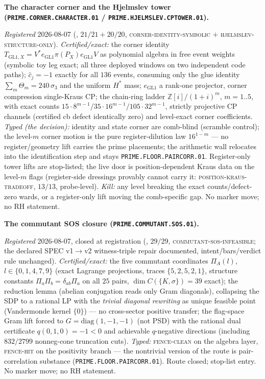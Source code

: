 \documentclass[11pt,a4paper]{article}
\newcommand{\Z}{\mathbb Z}
\begin{document}
\par\smallskip\noindent\textbf{The character corner and the
Hjelmslev tower (\texttt{PRIME.CORNER.CHARACTER.01} /
\texttt{PRIME.HJELMSLEV.CPTOWER.01}).}
{\sloppy
\emph{Registered} 2026-08-07
(, $21/21 + 20/20$,
\textsc{corner-identity-symbolic} $+$
\textsc{hjelmslev-structure-only}).  \emph{Certified/exact:} the
corner identity $T_{\mathrm{GL1},X} = V^* e_{\mathrm{GL1}}
\pi(P_X) e_{\mathrm{GL1}} V$ as polynomial algebra in free event
weights (symbolic toy leg exact; all three deployed windows on
two independent code paths); $\hat c_j = -1$ exactly for all
$136$ events, consuming only the glue identity
$\sum_m \Theta_m = 240\,\sigma_3$ and the uniform $H^*$ mass;
$e_{\mathrm{GL1}}$ a rank-one projector, corner compression
single-Kraus CP; the chain-ring ladder $\Z[i]/(1+i)^m$, $m=1..5$,
with exact counts $15\cdot8^{m-1}/35\cdot16^{m-1}/105\cdot
32^{m-1}$, strictly projective CP channels (certified cb defect
identically zero) and level-exact corner coefficients.
\emph{Typed (the decision):} identity and state corner are
comb-blind (scramble control); the level-$m$ corner motion is the
pure register-dilution law $16^{1-m}$ --- no register/geometry
lift carries the prime placements; the arithmetic wall relocates
into the identification step and stays
\texttt{PRIME.FLOOR.PAIRCORR.01}.  Register-only tower lifts are
stop-listed; the live door is position-dependent Kraus data on
the level-$m$ flags (register-side dressings provably cannot
carry it: \textsc{position-kraus-tradeoff}, $13/13$,
probe-level).  \emph{Kill:} any level breaking the exact
counts/defect-zero wards, or a register-only lift moving the
comb-specific gap.  No marker move; no RH statement.\par}

\par\smallskip\noindent\textbf{The commutant SOS closure
(\texttt{PRIME.COMMUTANT.SOS.01}).}
{\sloppy
\emph{Registered} 2026-08-07, closed at registration
(, $29/29$,
\textsc{commutant-sos-infeasible}; the declared SPEC v1$\to$v2
witness-triple repair documented, intent/bars/verdict rule
unchanged).  \emph{Certified/exact:} the five commutant
coordinates $\Pi_A(l)$, $l \in \{0,1,4,7,9\}$ (exact Lagrange
projections, traces $\{5,2,5,2,1\}$, structure constants
$\Pi_a\Pi_b = \delta_{ab}\Pi_a$ on all $25$ pairs,
$\dim C(\{K,\sigma\}) = 39$ exact); the reduction lemma (abelian
conjugation reads only Gram diagonals), collapsing the SDP to a
rational LP with the \emph{trivial diagonal rewriting} as unique
feasible point (Vandermonde kernel $\{0\}$) --- no cross-sector
positive transfer; the flag-space Gram lift forced to
$G = \mathrm{diag}(1,-1,-1)$ (not PSD) with the rational dual
certificate $q(0,1,0) = -1 < 0$ and achievable $q$-negative
directions (including $832/2799$ nonneg-cone truncation cuts).
\emph{Typed:} \textsc{fence-clean} on the algebra layer,
\textsc{fence-hit} on the positivity branch --- the nontrivial
version of the route is pair-correlation substance
(\texttt{PRIME.FLOOR.PAIRCORR.01}).  Route closed; stop-list
entry.  No marker move; no RH statement.\par}
\end{document}
